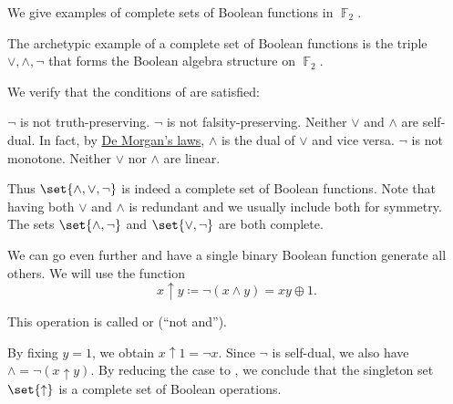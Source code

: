 \begin{example}\label{ex:posts_completeness_theorem}
  We give examples of complete sets of Boolean functions in \( \BbbF_2 \).

  \begin{exenum}
     The archetypic example of a complete set of Boolean functions is the triple \( \vee, \wedge, \neg \) that forms the Boolean algebra structure on \( \BbbF_2 \).

    We verify that the conditions of  are satisfied:
    \begin{RefList}
       \( \neg \) is not truth-preserving.
       \( \neg \) is not falsity-preserving.
       Neither \( \vee \) and \( \wedge \) are self-dual. In fact, by \hyperref[thm:de_morgans_laws]{De Morgan's laws}, \( \wedge \) is the dual of \( \vee \) and vice versa.
       \( \neg \) is not monotone.
       Neither \( \vee \) nor \( \wedge \) are linear.
    \end{RefList}

    Thus \( \set{ \wedge, \vee, \neg } \) is indeed a complete set of Boolean functions. Note that having both \( \vee \) and \( \wedge \) is redundant and we usually include both for symmetry. The sets \( \set{ \wedge, \neg } \) and \( \set{ \vee, \neg } \) are both complete.

     We can go even further and have a single binary Boolean function generate all others. We will use the function
    \begin{equation}\label{eq:ex:posts_completeness_theorem/nand}
      x \uparrow y \coloneqq \neg(x \wedge y) = xy \oplus 1.
    \end{equation}

    This operation is called  or  (\enquote{not and}).

    By fixing \( y = 1 \), we obtain \( x \uparrow 1 = \neg x \). Since \( \neg \) is self-dual, we also have \( \wedge = \neg(x \uparrow y) \). By reducing the case to , we conclude that the singleton set \( \set{ \uparrow } \) is a complete set of Boolean operations.


\end{exenum}
\end{example}
